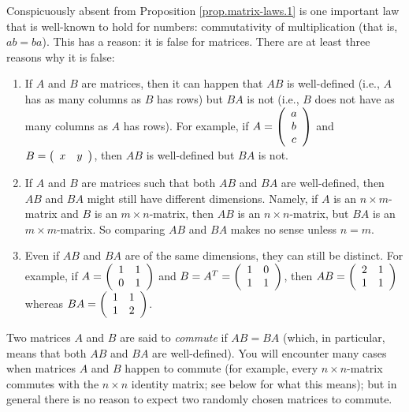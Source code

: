\documentclass[numbers=enddot,12pt,final,onecolumn,notitlepage]{scrartcl}%
\theoremstyle{definition}
\begin{document}
Conspicuously absent from Proposition \ref{prop.matrix-laws.1} is one
important law that is well-known to hold for numbers: commutativity of
multiplication (that is, $ab=ba$). This has a reason: it is false for
matrices. There are at least three reasons why it is false:

\begin{enumerate}
\item If $A$ and $B$ are matrices, then it can happen that $AB$ is
well-defined (i.e., $A$ has as many columns as $B$ has rows) but $BA$ is not
(i.e., $B$ does not have as many columns as $A$ has rows). For example, if
$A=\left(
\begin{array}
[c]{c}%
a\\
b\\
c
\end{array}
\right)  $ and $B=\left(
\begin{array}
[c]{cc}%
x & y
\end{array}
\right)  $, then $AB$ is well-defined but $BA$ is not.

\item If $A$ and $B$ are matrices such that both $AB$ and $BA$ are
well-defined, then $AB$ and $BA$ might still have different dimensions.
Namely, if $A$ is an $n\times m$-matrix and $B$ is an $m\times n$-matrix, then
$AB$ is an $n\times n$-matrix, but $BA$ is an $m\times m$-matrix. So comparing
$AB$ and $BA$ makes no sense unless $n=m$.

\item Even if $AB$ and $BA$ are of the same dimensions, they can still be
distinct. For example, if $A=\left(
\begin{array}
[c]{cc}%
1 & 1\\
0 & 1
\end{array}
\right)  $ and $B=A^{T}=\left(
\begin{array}
[c]{cc}%
1 & 0\\
1 & 1
\end{array}
\right)  $, then $AB=\left(
\begin{array}
[c]{cc}%
2 & 1\\
1 & 1
\end{array}
\right)  $ whereas $BA=\left(
\begin{array}
[c]{cc}%
1 & 1\\
1 & 2
\end{array}
\right)  $.
\end{enumerate}

Two matrices $A$ and $B$ are said to \textit{commute} if $AB=BA$ (which, in
particular, means that both $AB$ and $BA$ are well-defined). You will
encounter many cases when matrices $A$ and $B$ happen to commute (for example,
every $n\times n$-matrix commutes with the $n\times n$ identity matrix; see
below for what this means); but in general there is no reason to expect two
randomly chosen matrices to commute.
\end{document}
